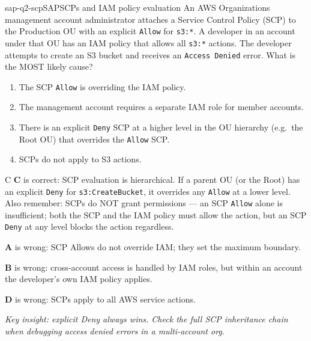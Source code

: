 
\begin{question}{sap-q2-scp}{SAP}{SCPs and IAM policy evaluation}
An AWS Organizations management account administrator attaches a Service Control Policy (SCP) to the Production OU with an explicit \texttt{Allow} for \texttt{s3:*}. A developer in an account under that OU has an IAM policy that allows all \texttt{s3:*} actions. The developer attempts to create an S3 bucket and receives an \texttt{Access Denied} error. What is the MOST likely cause?

\begin{enumerate}[label=\Alph*.]
  \item The SCP \texttt{Allow} is overriding the IAM policy.
  \item The management account requires a separate IAM role for member accounts.
  \item There is an explicit \texttt{Deny} SCP at a higher level in the OU hierarchy (e.g.\ the Root OU) that overrides the \texttt{Allow} SCP.
  \item SCPs do not apply to S3 actions.
\end{enumerate}
\end{question}

\begin{answer}{C}
\textbf{C} is correct: SCP evaluation is hierarchical. If a parent OU (or the Root) has an explicit \texttt{Deny} for \texttt{s3:CreateBucket}, it overrides any \texttt{Allow} at a lower level. Also remember: SCPs do NOT grant permissions --- an SCP \texttt{Allow} alone is insufficient; both the SCP and the IAM policy must allow the action, but an SCP \texttt{Deny} at any level blocks the action regardless.

\textbf{A} is wrong: SCP Allows do not override IAM; they set the maximum boundary.

\textbf{B} is wrong: cross-account access is handled by IAM roles, but within an account the developer's own IAM policy applies.

\textbf{D} is wrong: SCPs apply to all AWS service actions.

\textit{Key insight: explicit Deny always wins. Check the full SCP inheritance chain when debugging access denied errors in a multi-account org.}
\end{answer}



